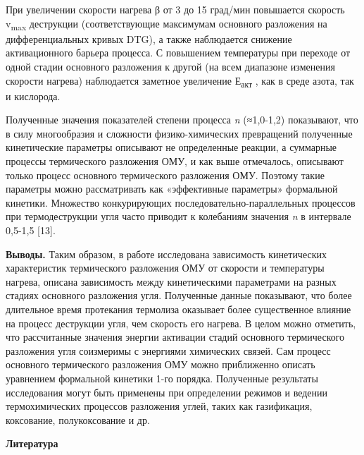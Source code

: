 \begin{multicols}{2}
При увеличении скорости нагрева β от 3 до 15 град/мин повышается
скорость v\textsubscript{max} деструкции (соответствующие максимумам
основного разложения на дифференциальных кривых DTG), а также
наблюдается снижение активационного барьера процесса. С повышением
температуры при переходе от одной стадии основного разложения к другой
(на всем диапазоне изменения скорости нагрева) наблюдается заметное
увеличение Е\textsubscript{акт} , как в среде азота, так и кислорода.

Полученные значения показателей степени процесса \emph{n} (≈1,0-1,2)
показывают, что в силу многообразия и сложности физико-химических
превращений полученные кинетические параметры описывают не определенные
реакции, а суммарные процессы термического разложения ОМУ, и как выше
отмечалось, описывают только процесс основного термического разложения
ОМУ. Поэтому такие параметры можно рассматривать как «эффективные
параметры» формальной кинетики. Множество конкурирующих
последовательно-параллельных процессов при термодеструкции угля часто
приводит к колебаниям значения \emph{n} в интервале 0,5-1,5 {[}13{]}.

{\bfseries Выводы.} Таким образом, в работе исследована зависимость
кинетических характеристик термического разложения ОМУ от скорости и
температуры нагрева, описана зависимость между кинетическими параметрами
на разных стадиях основного разложения угля. Полученные данные
показывают, что более длительное время протекания термолиза оказывает
более существенное влияние на процесс деструкции угля, чем скорость его
нагрева. В целом можно отметить, что рассчитанные значения энергии
активации стадий основного термического разложения угля соизмеримы с
энергиями химических связей. Сам процесс основного термического
разложения ОМУ можно приближенно описать уравнением формальной кинетики
1-го порядка. Полученные результаты исследования могут быть применены
при определении режимов и ведении термохимических процессов разложения
углей, таких как газификация, коксование, полукоксование и др.
\end{multicols}
\newpage
\begin{center}
{\bfseries Литература}
\end{center}

